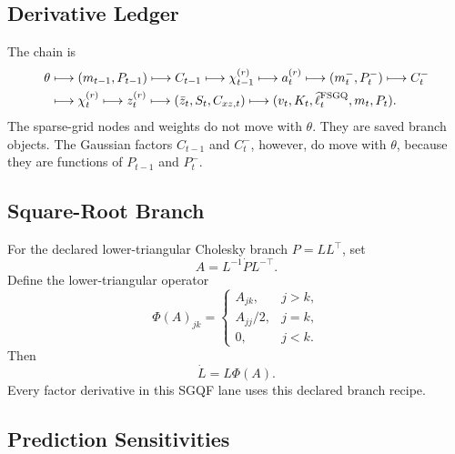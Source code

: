 \subsection{Derivative Ledger}
\label{sec:bf-hd-sgqf-derivative-ledger}

The chain is
\begin{equation}
\begin{aligned}
  \theta
  &\longmapsto
  (m_{t-1},P_{t-1})
  \longmapsto
  C_{t-1}
  \longmapsto
  \chi_{t-1}^{(r)}
  \longmapsto
  a_t^{(r)}
  \longmapsto
  (m_t^-,P_t^-)
  \longmapsto
  C_t^- \\
  &\longmapsto
  \chi_t^{(r)}
  \longmapsto
  z_t^{(r)}
  \longmapsto
  (\bar z_t,S_t,C_{xz,t})
  \longmapsto
  (v_t,K_t,\widehat\ell_t^{\rm FSGQ},m_t,P_t).
\end{aligned}
  \label{eq:bf-hd-sgqf-derivative-chain}
\end{equation}
The sparse-grid nodes and weights do not move with \(\theta\).  They are saved
branch objects.  The Gaussian factors \(C_{t-1}\) and \(C_t^-\), however, do move
with \(\theta\), because they are functions of \(P_{t-1}\) and \(P_t^-\).

\subsection{Square-Root Branch}
\label{sec:bf-hd-sgqf-square-root-branch}

For the declared lower-triangular Cholesky branch \(P=LL^\top\), set
\begin{equation}
  A=L^{-1}\dot P L^{-\top}.
  \label{eq:bf-hd-sgqf-chol-A}
\end{equation}
Define the lower-triangular operator
\begin{equation}
  \Phi(A)_{jk}
  =
  \begin{cases}
  A_{jk}, & j>k,\\
  A_{jj}/2, & j=k,\\
  0, & j<k.
  \end{cases}
  \label{eq:bf-hd-sgqf-chol-Phi}
\end{equation}
Then
\begin{equation}
  \dot L=L\Phi(A).
  \label{eq:bf-hd-sgqf-chol-derivative}
\end{equation}
Every factor derivative in this SGQF lane uses this declared branch recipe.

\subsection{Prediction Sensitivities}
\label{sec:bf-hd-sgqf-prediction-sensitivities}


